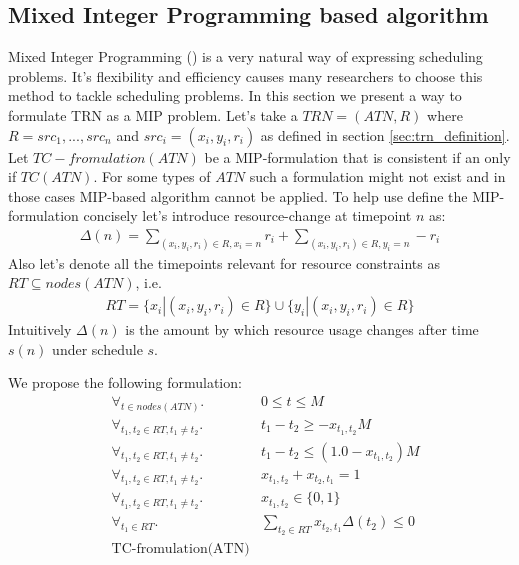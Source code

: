 \documentclass{article}
\begin{document}
\begin{multicols}{2}
\subsection{Mixed Integer Programming based algorithm}
Mixed Integer Programming (\cite{markowitz1957solution}) is a very natural way of expressing scheduling problems. It's flexibility and efficiency causes many researchers to choose this method to tackle scheduling problems. In this section we present a way to formulate TRN as a MIP problem. Let's take a $TRN=(ATN, R)$ where $R={src_1, ..., src_n}$ and $src_i = (x_i, y_i, r_i)$ as defined in section \ref{sec:trn_definition}. Let $TC-fromulation(ATN)$ be a MIP-formulation that is consistent if an only if $TC(ATN)$. For some types of $ATN$ such a formulation might not exist and in those cases MIP-based algorithm cannot be applied. To help use define the MIP-formulation concisely let's introduce resource-change at timepoint $n$ as:
\begin{align*}
\Delta(n) = \sum_{(x_i, y_i, r_i) \in R, x_i = n} r_i + \sum_{(x_i, y_i, r_i) \in R, y_i = n} -r_i
\end{align*}
Also let's denote all the timepoints relevant for resource constraints as $RT \subseteq nodes(ATN)$, i.e.
\begin{align*}
RT = \{ x_i | (x_i, y_i, r_i) \in R \} \cup \{ y_i | (x_i, y_i, r_i) \in R \}
\end{align*}
Intuitively $\Delta(n)$ is the amount by which resource usage changes after time $s(n)$ under schedule $s$.

We propose the following formulation:
\begin{align}
\label{eq:mip0} & \forall_{t \in nodes(ATN)}.              & 0 \leq t \leq M \\
\label{eq:mip1} & \forall_{t_1, t_2 \in RT, t_1 \neq t_2}. & t_1 - t_2 \geq - x_{t_1,t_2} M \\
\label{eq:mip2} & \forall_{t_1, t_2 \in RT, t_1 \neq t_2}. & t_1 - t_2 \leq (1.0 - x_{t_1,t_2}) M\\
\label{eq:mip3} & \forall_{t_1, t_2 \in RT, t_1 \neq t_2}. & x_{t_1,t_2} + x_{t_2,t_1}  = 1\\
\label{eq:mip4} & \forall_{t_1, t_2 \in RT, t_1 \neq t_2}. & x_{t_1,t_2} \in \{ 0, 1 \} \\
\label{eq:mip5} & \forall_{t_1 \in RT}.                    & \sum_{t_2 \in RT} x_{t_2, t_1} \Delta(t_2) \leq 0\\
\label{eq:mip6} & \text{TC-fromulation(ATN)}
\end{align}


\end{multicols}
\end{document}
